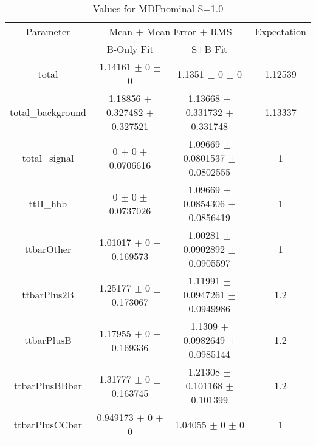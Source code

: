 \begin{table}
\centering
\caption{Values for MDFnominal S=1.0}
\begin{tabular}{cccc}
\toprule
Parameter & \multicolumn{2}{c}{Mean $\pm$ Mean Error $\pm$ RMS} & Expectation\\
 & B-Only Fit & S+B Fit & \\
\midrule
total & \num{1.14161} $\pm$ \num{0} $\pm$ \num{0} & \num{1.1351} $\pm$ \num{0} $\pm$ \num{0} & \num{1.12539}\\
total\_background & \num{1.18856} $\pm$ \num{0.327482} $\pm$ \num{0.327521} & \num{1.13668} $\pm$ \num{0.331732} $\pm$ \num{0.331748} & \num{1.13337}\\
total\_signal & \num{0} $\pm$ \num{0} $\pm$ \num{0.0706616} & \num{1.09669} $\pm$ \num{0.0801537} $\pm$ \num{0.0802555} & \num{1}\\
ttH\_hbb & \num{0} $\pm$ \num{0} $\pm$ \num{0.0737026} & \num{1.09669} $\pm$ \num{0.0854306} $\pm$ \num{0.0856419} & \num{1}\\
ttbarOther & \num{1.01017} $\pm$ \num{0} $\pm$ \num{0.169573} & \num{1.00281} $\pm$ \num{0.0902892} $\pm$ \num{0.0905597} & \num{1}\\
ttbarPlus2B & \num{1.25177} $\pm$ \num{0} $\pm$ \num{0.173067} & \num{1.11991} $\pm$ \num{0.0947261} $\pm$ \num{0.0949986} & \num{1.2}\\
ttbarPlusB & \num{1.17955} $\pm$ \num{0} $\pm$ \num{0.169336} & \num{1.1309} $\pm$ \num{0.0982649} $\pm$ \num{0.0985144} & \num{1.2}\\
ttbarPlusBBbar & \num{1.31777} $\pm$ \num{0} $\pm$ \num{0.163745} & \num{1.21308} $\pm$ \num{0.101168} $\pm$ \num{0.101399} & \num{1.2}\\
ttbarPlusCCbar & \num{0.949173} $\pm$ \num{0} $\pm$ \num{0} & \num{1.04055} $\pm$ \num{0} $\pm$ \num{0} & \num{1}\\
\bottomrule
\end{tabular}
\end{table}